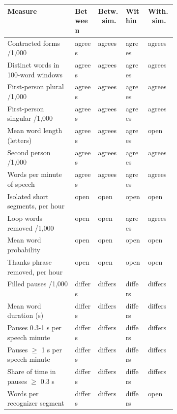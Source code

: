 {\scriptsize\setlength{\tabcolsep}{3pt}
\begin{tabular}{@{}p{0.40\linewidth}llll@{}}
\toprule
Measure & Between & Betw.\ sim. & Within & With.\ sim. \\
\midrule
Contracted forms /1,000 & agrees & agrees & agrees & agrees \\
Distinct words in 100-word windows & agrees & agrees & agrees & agrees \\
First-person plural /1,000 & agrees & agrees & agrees & agrees \\
First-person singular /1,000 & agrees & agrees & agrees & agrees \\
Mean word length (letters) & agrees & agrees & agrees & open \\
Second person /1,000 & agrees & agrees & agrees & agrees \\
Words per minute of speech & agrees & agrees & agrees & agrees \\
Isolated short segments, per hour & open & open & open & open \\
Loop words removed /1,000 & open & open & agrees & agrees \\
Mean word probability & open & open & open & open \\
Thanks phrase removed, per hour & open & open & open & open \\
Filled pauses /1,000 & differs & differs & differs & differs \\
Mean word duration (s) & differs & differs & differs & differs \\
Pauses 0.3-1 s per speech minute & differs & differs & differs & differs \\
Pauses $\geq$ 1 s per speech minute & differs & differs & differs & differs \\
Share of time in pauses $\geq$ 0.3 s & differs & differs & differs & differs \\
Words per recognizer segment & differs & differs & differs & open \\
\bottomrule
\end{tabular}}

